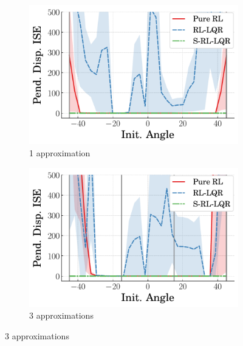 %
\begin{figure}
    \centering
    \begin{subfigure}[b]{0.32\textwidth}
        \centering
        \includegraphics[width=\textwidth]{figures/figures_Interpretability/Mean_ISE_Inverted_Pendulum-v0_cubic_1_bins_near_equil/Mean_ISE_Inverted_Pendulum-v0_cubic_Pend_Disp_1_bins.pdf}
        \caption{1 approximation}
        \label{subfig_chap5:near_equil_1_bins_unclipped}
    \end{subfigure}
    \hfill
    \begin{subfigure}[b]{0.32\textwidth}
        \centering
        \includegraphics[width=\textwidth]{figures/figures_Interpretability/Mean_ISE_Inverted_Pendulum-v0_cubic_3_bins_near_equil/Mean_ISE_Inverted_Pendulum-v0_cubic_Pend_Disp_3_bins.pdf}
        \caption{3 approximations}
        \label{subfig_chap5:near_equil_3_bins_unclipped}
    \end{subfigure}

\end{figure}
